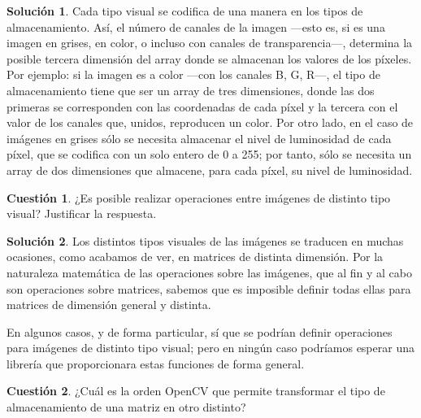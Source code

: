 \documentclass[a4paper, 11pt]{article}
\theoremstyle{definition}
\newtheorem{cuestion}{Cuestión}
\newtheorem*{solucion}{Solución}
\begin{document}
  \begin{solucion}
      Cada tipo visual se codifica de una manera en los tipos de almacenamiento. Así, el número de canales de la imagen ---esto es, si es una imagen en grises, en color, o incluso con canales de transparencia---, determina la posible tercera dimensión del array donde se almacenan los valores de los píxeles. Por ejemplo: si la imagen es a color ---con los canales B, G, R---, el tipo de almacenamiento tiene que ser un array de tres dimensiones, donde las dos primeras se corresponden con las coordenadas de cada píxel y la tercera con el valor de los canales que, unidos, reproducen un color. Por otro lado, en el caso de imágenes en grises sólo se necesita almacenar el nivel de luminosidad de cada píxel, que se codifica con un solo entero de 0 a 255; por tanto, sólo se necesita un array de dos dimensiones que almacene, para cada píxel, su nivel de luminosidad.
  \end{solucion}

  \begin{cuestion}
      ¿Es posible realizar operaciones entre imágenes de distinto tipo visual? Justificar la respuesta.
  \end{cuestion}

  \begin{solucion}
      Los distintos tipos visuales de las imágenes se traducen en muchas ocasiones, como acabamos de ver, en matrices de distinta dimensión. Por la naturaleza matemática de las operaciones sobre las imágenes, que al fin y al cabo son operaciones sobre matrices, sabemos que es imposible definir todas ellas para matrices de dimensión general y distinta.

      En algunos casos, y de forma particular, sí que se podrían definir operaciones para imágenes de distinto tipo visual; pero en ningún caso podríamos esperar una librería que proporcionara estas funciones de forma general.
  \end{solucion}

  \begin{cuestion}
      ¿Cuál es la orden OpenCV que permite transformar el tipo de almacenamiento de una matriz en otro distinto?
  \end{cuestion}
\end{document}

